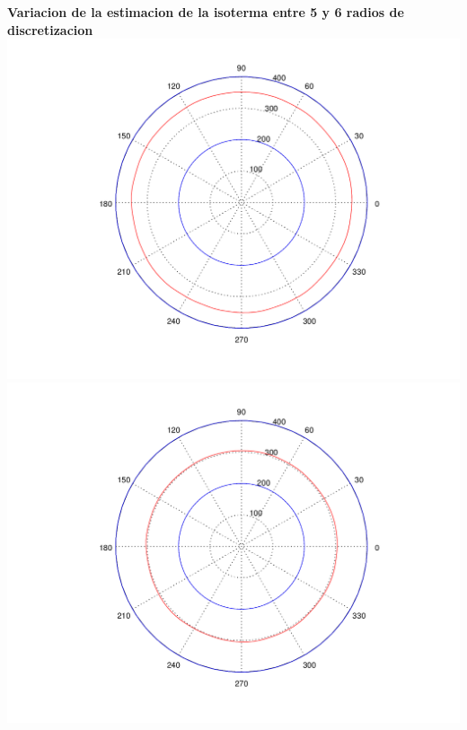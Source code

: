 \begin{enumerate}
  	\textbf{Variacion de la estimacion de la isoterma entre 5 y 6 radios de discretizacion}\\
	\includegraphics[scale=0.35]{experimentos1a_1b/evolucion_posicion_isoterma_temperatura/test2/test6_006_radios_inst_001_isomap.png}
	\includegraphics[scale=0.35]{experimentos1a_1b/evolucion_posicion_isoterma_temperatura/test2/test6_007_radios_inst_001_isomap.png}
	

\end{enumerate}
